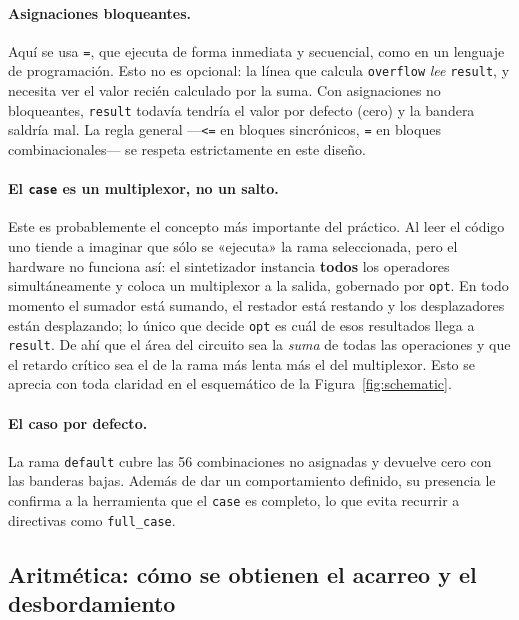 \documentclass[12pt,a4paper]{article}
\begin{document}
\paragraph{Asignaciones bloqueantes.} Aquí se usa \texttt{=}, que ejecuta de forma
inmediata y secuencial, como en un lenguaje de programación. Esto no es opcional: la línea
que calcula \texttt{overflow} \emph{lee} \texttt{result}, y necesita ver el valor recién
calculado por la suma. Con asignaciones no bloqueantes, \texttt{result} todavía tendría el
valor por defecto (cero) y la bandera saldría mal. La regla general ---\texttt{<=} en
bloques sincrónicos, \texttt{=} en bloques combinacionales--- se respeta estrictamente en
este diseño.

\paragraph{El \texttt{case} es un multiplexor, no un salto.} Este es probablemente el
concepto más importante del práctico. Al leer el código uno tiende a imaginar que sólo se
«ejecuta» la rama seleccionada, pero el hardware no funciona así: el sintetizador
instancia \textbf{todos} los operadores simultáneamente y coloca un multiplexor a la
salida, gobernado por \texttt{opt}. En todo momento el sumador está sumando, el restador
está restando y los desplazadores están desplazando; lo único que decide \texttt{opt} es
cuál de esos resultados llega a \texttt{result}. De ahí que el área del circuito sea la
\emph{suma} de todas las operaciones y que el retardo crítico sea el de la rama más lenta
más el del multiplexor. Esto se aprecia con toda claridad en el esquemático de la
Figura~\ref{fig:schematic}.

\paragraph{El caso por defecto.} La rama \texttt{default} cubre las 56 combinaciones no
asignadas y devuelve cero con las banderas bajas. Además de dar un comportamiento definido,
su presencia le confirma a la herramienta que el \texttt{case} es completo, lo que evita
recurrir a directivas como \texttt{full\_case}.

\subsection{Aritmética: cómo se obtienen el acarreo y el desbordamiento}
\end{document}

